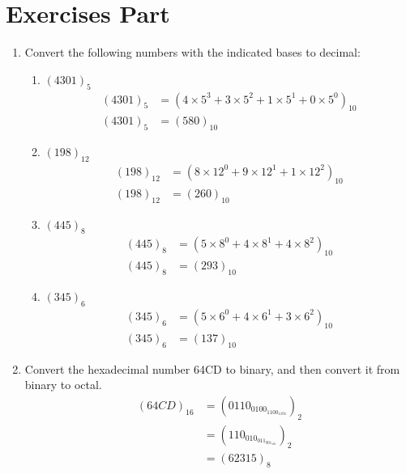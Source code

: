 \documentclass[12pt]{book}
\begin{document}
\section*{Exercises Part}

\begin{enumerate}
    \item Convert the following numbers with the indicated bases to decimal:
    \begin{enumerate}
        \item $(4301)_5$
        \begin{align*}
            (4301)_5 &= (4 \times 5^3 + 3 \times 5^2 + 1 \times 5^1 + 0 \times 5^0)_{10} \\
            (4301)_5 &= (580)_{10}
        \end{align*}
        \item $(198)_{12}$
        \begin{align*}
            (198)_{12} &= (8 \times 12^0 + 9 \times 12^1 + 1 \times 12^2)_{10} \\
            (198)_{12} &= (260)_{10}
        \end{align*}
        \item $(445)_{8}$
        \begin{align*}
            (445)_{8} &= (5 \times 8^0 + 4 \times 8^1 + 4 \times 8^2)_{10} \\
            (445)_{8} &= (293)_{10}
        \end{align*}
        \item $(345)_{6}$
        \begin{align*}
            (345)_{6} &= (5 \times 6^0 + 4 \times 6^1 + 3 \times 6^2)_{10} \\
            (345)_{6} &= (137)_{10}
        \end{align*}
    \end{enumerate}
    
    \item Convert the hexadecimal number 64CD to binary, and then convert it from binary to octal.
    \begin{align*}
        (64CD)_{16} &= (0110_0100_1100_1101)_2 \\
        &= (110_010_011_001_101)_2 \\
        &= (62315)_8
    \end{align*}
    

\end{enumerate}
\end{document}
